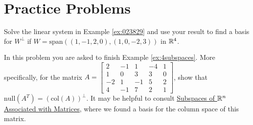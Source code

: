 \documentclass{ximera}
\begin{document}
\section*{Practice Problems}
\begin{problem}\label{prob:Uperp}
Solve the linear system in Example \ref{ex:023829} and use your result to find a basis for $W^\perp$ if $W = \mbox{span}\left((1, -1, 2, 0), (1, 0, -2, 3)\right)$ in $\mathbb{R}^4$.
\end{problem}

\begin{problem}\label{prob:brokenInteractive}
    \begin{center}
\end{center}
\end{problem}

\begin{problem}\label{prob:finishex4subspaces}
In this problem you are asked to finish Example \ref{ex:4subspaces}.  More specifically, for the matrix $A=\begin{bmatrix}2&-1&1&-4&1\\1&0&3&3&0\\-2&1&-1&5&2\\4&-1&7&2&1\end{bmatrix}$, show that $\mbox{null}(A^T) = (\mbox{col}(A))^\perp$.  It may be helpful to consult \href{https://ximera.osu.edu/oerlinalg/LinearAlgebra/VSP-0040/main}{\underline{Subspaces of $\mathbb{R}^n$ Associated with Matrices}}, where we found a basis for the column space of this matrix.
\end{problem}
\end{document}
